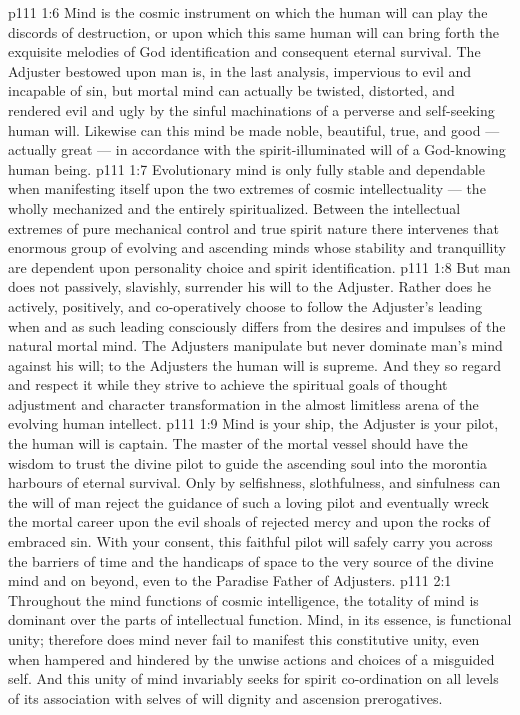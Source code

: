 \vs p111 1:6 Mind is the cosmic instrument on which the human will can play the discords of destruction, or upon which this same human will can bring forth the exquisite melodies of God identification and consequent eternal survival. The Adjuster bestowed upon man is, in the last analysis, impervious to evil and incapable of sin, but mortal mind can actually be twisted, distorted, and rendered evil and ugly by the sinful machinations of a perverse and self\hyp{}seeking human will. Likewise can this mind be made noble, beautiful, true, and good --- actually great --- in accordance with the spirit\hyp{}illuminated will of a God\hyp{}knowing human being.
\vs p111 1:7 \pc Evolutionary mind is only fully stable and dependable when manifesting itself upon the two extremes of cosmic intellectuality --- the wholly mechanized and the entirely spiritualized. Between the intellectual extremes of pure mechanical control and true spirit nature there intervenes that enormous group of evolving and ascending minds whose stability and tranquillity are dependent upon personality choice and spirit identification.
\vs p111 1:8 But man does not passively, slavishly, surrender his will to the Adjuster. Rather does he actively, positively, and co\hyp{}operatively choose to follow the Adjuster’s leading when and as such leading consciously differs from the desires and impulses of the natural mortal mind. The Adjusters manipulate but never dominate man’s mind against his will; to the Adjusters the human will is supreme. And they so regard and respect it while they strive to achieve the spiritual goals of thought adjustment and character transformation in the almost limitless arena of the evolving human intellect.
\vs p111 1:9 \pc Mind is your ship, the Adjuster is your pilot, the human will is captain. The master of the mortal vessel should have the wisdom to trust the divine pilot to guide the ascending soul into the morontia harbours of eternal survival. Only by selfishness, slothfulness, and sinfulness can the will of man reject the guidance of such a loving pilot and eventually wreck the mortal career upon the evil shoals of rejected mercy and upon the rocks of embraced sin. With your consent, this faithful pilot will safely carry you across the barriers of time and the handicaps of space to the very source of the divine mind and on beyond, even to the Paradise Father of Adjusters.
\vs p111 2:1 Throughout the mind functions of cosmic intelligence, the totality of mind is dominant over the parts of intellectual function. Mind, in its essence, is functional unity; therefore does mind never fail to manifest this constitutive unity, even when hampered and hindered by the unwise actions and choices of a misguided self. And this unity of mind invariably seeks for spirit co\hyp{}ordination on all levels of its association with selves of will dignity and ascension prerogatives.
